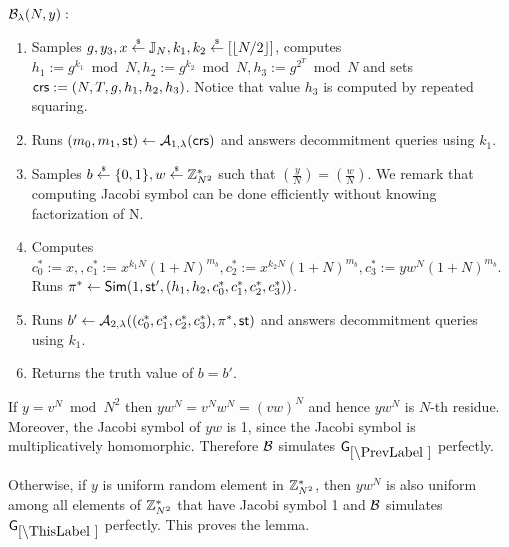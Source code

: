 $\mathcal{B}_{\lambda}(N,y):$
\vspace{-2mm}
\begin{enumerate}
\item Samples $g, y_3, x \stackrel{{\scriptscriptstyle\$}}{\leftarrow} \mathbb{J}_N, k_1, k_2 \stackrel{{\scriptscriptstyle\$}}{\leftarrow} [\left\lfloor N/2 \right\rfloor]$, computes $h_1 := g^{k_1} \bmod N, h_2 := g^{k_2} \bmod N,  h_3 := g^{2^{T}} \bmod N$ and sets $\mathsf{crs}:=(N, T, g, h_1, h_2, h_3)$. Notice that value $h_3$ is computed by repeated squaring.
\item Runs $(m_0, m_1, \mathsf{st}) \leftarrow \mathcal{A}_{1, \lambda}(\mathsf{crs})$ and answers decommitment queries using $k_1$.
\item Samples $b \stackrel{{\scriptscriptstyle\$}}{\leftarrow} \{0,1\}, w \stackrel{{\scriptscriptstyle\$}}{\leftarrow} \mathbb{Z}_{N^2}^*$ such that $\left( \frac{y}{N} \right)= \left( \frac{w}{N} \right)$. We remark that computing Jacobi symbol can be done efficiently without knowing factorization of N.
\item Computes $c_0^*:=x, , c_1^*:=x^{k_1N}(1+N)^{m_b}, c_2^*:=x^{k_2N}(1+N)^{m_b}, c_3^*:=yw^{N}(1+N)^{m_b}$. Runs $\pi^* \leftarrow \mathsf{Sim}(1, \mathsf{st}', (h_1, h_2, c_0^*, c_1^*, c_2^*, c_3^*))$.
\item Runs $b' \leftarrow \mathcal{A}_{2, \lambda}((c_0^*, c_1^*, c_2^*, c_3^*), \pi^*, \mathsf{st})$ and answers decommitment queries using $k_1$.
\item Returns the truth value of $b=b'$.
\end{enumerate}

If $y = v^N \bmod N^2$ then $yw^N = v^N w^N = (vw)^N$ and hence $yw^N$ is $N$-th residue. Moreover, the Jacobi symbol of $yw$ is 1, since the Jacobi symbol is multiplicatively homomorphic. Therefore $\mathcal{B}$ simulates $\games_\prevgame$ perfectly. 

Otherwise, if $y$ is uniform random element in $\mathbb{Z}_{N^2}^*$, then $yw^N$ is also uniform among all elements of $\mathbb{Z}_{N^2}^*$ that have Jacobi symbol 1 and $\mathcal{B}$ simulates $\games_\thisgame$ perfectly. This proves the lemma.

